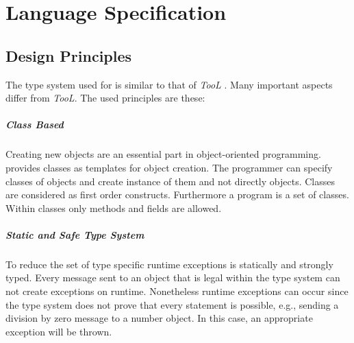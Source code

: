\chapter{Language Specification}
\section{Design Principles}
The type system used for \ooplss is similar to that of \emph{TooL}
\cite{gawecki_tool:_1995}. Many important aspects differ from
\emph{TooL}. The used principles are these:


\paragraph{Class Based}
Creating new objects are an essential part in object-oriented
programming. \ooplss provides classes as templates for object
creation. The programmer can specify classes of objects and create
instance of them and not directly objects. Classes are considered as
first order constructs. Furthermore a program is a set of classes. Within
classes only methods and fields are allowed.

\paragraph{Static and Safe Type System}
To reduce the set of type specific runtime exceptions \ooplss is statically
and strongly typed. Every message sent to an object that is legal within
the type system can not create exceptions on runtime. Nonetheless runtime
exceptions can occur since the type system does not prove that every
statement is possible, e.g., sending a division by zero message to a
number object.  In this case, an appropriate exception will be thrown.


